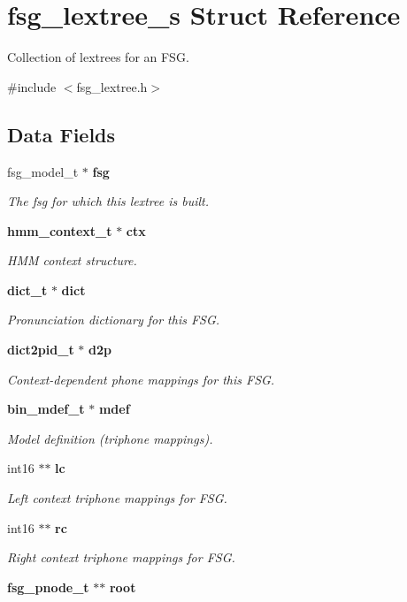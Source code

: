 \section{fsg\+\_\+lextree\+\_\+s Struct Reference}
\label{structfsg__lextree__s}


Collection of lextrees for an F\+S\+G.  




{\ttfamily \#include $<$fsg\+\_\+lextree.\+h$>$}

\subsection*{Data Fields}
\begin{DoxyCompactItemize}
\item 
fsg\+\_\+model\+\_\+t $\ast$ {\bf fsg}
\begin{DoxyCompactList}\small\item\em The fsg for which this lextree is built. \end{DoxyCompactList}\item 
{\bf hmm\+\_\+context\+\_\+t} $\ast$ {\bf ctx}
\begin{DoxyCompactList}\small\item\em H\+M\+M context structure. \end{DoxyCompactList}\item 
{\bf dict\+\_\+t} $\ast$ {\bf dict}
\begin{DoxyCompactList}\small\item\em Pronunciation dictionary for this F\+S\+G. \end{DoxyCompactList}\item 
{\bf dict2pid\+\_\+t} $\ast$ {\bf d2p}
\begin{DoxyCompactList}\small\item\em Context-\/dependent phone mappings for this F\+S\+G. \end{DoxyCompactList}\item 
{\bf bin\+\_\+mdef\+\_\+t} $\ast$ {\bf mdef}
\begin{DoxyCompactList}\small\item\em Model definition (triphone mappings). \end{DoxyCompactList}\item 
int16 $\ast$$\ast$ {\bf lc}
\begin{DoxyCompactList}\small\item\em Left context triphone mappings for F\+S\+G. \end{DoxyCompactList}\item 
int16 $\ast$$\ast$ {\bf rc}
\begin{DoxyCompactList}\small\item\em Right context triphone mappings for F\+S\+G. \end{DoxyCompactList}\item 
{\bf fsg\+\_\+pnode\+\_\+t} $\ast$$\ast$ {\bfseries root}\label{structfsg__lextree__s_a12e9668f7da3b84b0b36799a631fe8d3}


\end{DoxyCompactItemize}
